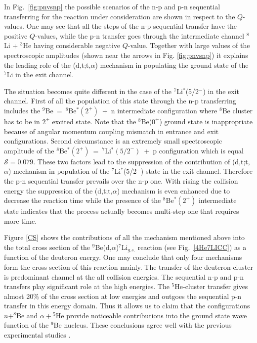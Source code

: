 \documentclass[10pt]{iopart}
\begin{document}
In Fig.~\ref{fig:pnvsnp} the possible scenarios of the n-p and p-n sequential transferring for the reaction under consideration are shown in respect to the $Q$-values. One may see that all the steps of the n-p sequential transfer have the positive $Q$-values, while the p-n transfer goes through the intermediate channel ${}^8$Li + ${}^3$He having considerable negative $Q$-value. Together with large values of the spectroscopic amplitudes (shown near the arrows in Fig. \ref{fig:pnvsnp}) it explains the leading role of the (d,t;t,$\alpha$) mechanism in populating the ground state of the ${}^7$Li in the exit channel.

The situation becomes quite different in the case of the ${}^7$Li$^*$(5/2$^-$) in the exit channel. First of all the population of this state through the n-p transferring includes the ${}^9$Be~=~${}^8$Be$^*(2^+)$~+~n intermediate configuration where ${}^8$Be cluster has to be in $2^+$ excited state. Note that the ${}^8$Be($0^+$) ground state is inappropriate because of angular momentum coupling mismatch in entrance and exit configurations. Second circumstance is an extremely small spectroscopic amplitude of the ${}^8$Be$^*(2^+)$~=~${}^7$Li$^*(5/2^-)$~+~p configuration which is equal $\mathcal{S} = 0.079$. These two factors lead to the suppression of the contribution of (d,t;t,$\alpha$) mechanism in population of the ${}^7$Li$^*$(5/2$^-$) state in the exit channel. Therefore the p-n sequential transfer prevails over the n-p one. With rising the collision energy the suppression of the (d,t;t,$\alpha$) mechanism is even enhanced due to decrease the reaction time while the presence of the ${}^8$Be$^*(2^+)$ intermediate state indicates that the process actually becomes multi-step one that requires more time.

Figure \ref{CS} shows the contributions of all the mechanism mentioned above into the total cross section of the ${}^9$Be(d,$\alpha$)${}^7$Li$_{g.s.}$ reaction (see Fig.~\ref{4He7LICC}) as a function of the deuteron energy. One may conclude that only four mechanisms form the cross section of this reaction mainly. The transfer of the deuteron-cluster is predominant channel at the all collision energies. The sequential n-p and p-n transfers play significant role at the high energies. The ${}^5$He-cluster transfer gives almost 20\% of the cross section at low energies and outgoes the sequential p-n transfer in this energy domain. Thus it allows us to claim that the configurations $n+^8$Be and $\alpha+{}^5$He provide noticeable contributions into the ground state wave function of the ${}^9$Be nucleus. These conclusions agree well with the previous experimental studies \cite{brown2007, papka2007}.
\end{document}

